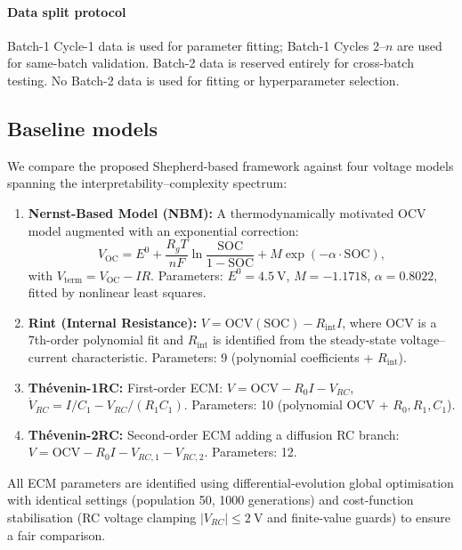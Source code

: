 \documentclass[5p,times,number]{elsarticle}
\begin{document}
\paragraph{Data split protocol}
Batch-1 Cycle-1 data is used for parameter fitting; Batch-1 Cycles 2--$n$ are used for same-batch validation.
Batch-2 data is reserved entirely for cross-batch testing.
No Batch-2 data is used for fitting or hyperparameter selection.

\subsection{Baseline models}\label{sec:baselines}
We compare the proposed Shepherd-based framework against four voltage models spanning the interpretability--complexity spectrum:
\begin{enumerate}[leftmargin=*, label=\arabic*.]
    \item \textbf{Nernst-Based Model (NBM):}
    A thermodynamically motivated OCV model augmented with an exponential correction:
    \begin{equation}\label{eq:nbm}
    V_{\mathrm{OC}} = E^0 + \frac{R_g T}{nF}\ln\!\frac{\mathrm{SOC}}{1-\mathrm{SOC}} + M\exp(-\alpha\cdot\mathrm{SOC}),
    \end{equation}
    with $V_{\mathrm{term}} = V_{\mathrm{OC}} - IR$.  Parameters: $E^0 = \SI{4.5}{\volt}$, $M = -1.1718$, $\alpha = 0.8022$, fitted by nonlinear least squares.
    \item \textbf{Rint (Internal Resistance):}
    $V = \mathrm{OCV}(\mathrm{SOC}) - R_{\mathrm{int}} I$, where OCV is a 7th-order polynomial fit and $R_{\mathrm{int}}$ is identified from the steady-state voltage--current characteristic.  Parameters: 9 (polynomial coefficients + $R_{\mathrm{int}}$).
    \item \textbf{Th\'{e}venin-1RC:}
    First-order ECM: $V = \mathrm{OCV} - R_0 I - V_{RC}$, $\dot{V}_{RC} = I/C_1 - V_{RC}/(R_1 C_1)$.  Parameters: 10 (polynomial OCV + $R_0, R_1, C_1$).
    \item \textbf{Th\'{e}venin-2RC:}
    Second-order ECM adding a diffusion RC branch: $V = \mathrm{OCV} - R_0 I - V_{RC,1} - V_{RC,2}$.  Parameters: 12.
\end{enumerate}
All ECM parameters are identified using differential-evolution global optimisation with identical settings (population 50, 1000 generations) and cost-function stabilisation (RC voltage clamping $|V_{RC}| \le \SI{2}{\volt}$ and finite-value guards) to ensure a fair comparison.
\end{document}
